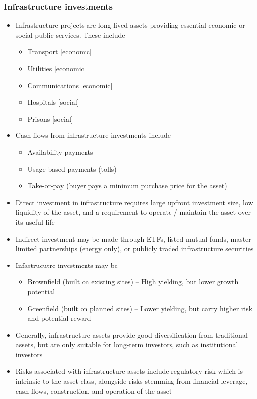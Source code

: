 \documentclass[../notes_compiled.tex]{subfiles}
\begin{document}
\subsubsection{Infrastructure investments}
\begin{itemize}
\item Infrastructure projects are long-lived assets providing essential economic or social public services. These include
\begin{itemize}
\item Transport [economic]
\item Utilities [economic]
\item Communications [economic]
\item Hospitals [social]
\item Prisons [social]
\end{itemize}
\item Cash flows from infrastructure investments include
\begin{itemize}
\item Availability payments
\item Usage-based payments (tolls)
\item Take-or-pay (buyer pays a minimum purchase price for the asset)
\end{itemize}
\item Direct investment in infrastructure requires large upfront investment size, low liquidity of the asset, and a requirement to operate / maintain the asset over its useful life
\item Indirect investment may be made through ETFs, listed mutual funds, master limited partnerships (energy only), or publicly traded infrastructure securities
\item Infastrucutre investments may be
\begin{itemize}
\item Brownfield (built on existing sites) -- High yielding, but lower growth potential
\item Greenfield (built on planned sites) -- Lower yielding, but carry higher risk and potential reward
\end{itemize}
\item Generally, infrastructure assets provide good diversification from traditional assets, but are only suitable for long-term investors, such as institutional investors
\item Risks associated with infrastructure assets include regulatory risk which is intrinsic to the asset class, alongside risks stemming from financial leverage, cash flows, construction, and operation of the asset
\end{itemize}
\end{document}
